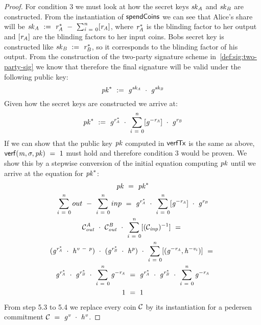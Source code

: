 \begin{proof}
    For condition 3 we must look at how the secret keys $\mathit{sk}_{\mathit{A}}$ and $\mathit{sk}_{\mathit{B}}$ are constructed.
    From the instantiation of $\mathsf{spendCoins}$ we can see that Alice's share will be $\mathit{sk}_{\mathit{A}} ~:=~ \mathit{r}_{\mathit{A}}^* ~-~ \sum_{\mathit{i} ~=~ 0}^{\mathit{n}} [\mathit{r}_{\mathit{A}}]$, where $\mathit{r}_{\mathit{A}}^*$ is the blinding factor to her output and $[\mathit{r}_{\mathit{A}}]$ are the blinding factors to her input coins.
    Bobs secret key is constructed like $\mathit{sk}_{\mathit{B}} ~:=~ \mathit{r}_{\mathit{B}}^*$, so it corresponds to the blinding factor of his output.
    From the construction of the two-party signature scheme in~\ref{def:sig:two-party-sig} we know that therefore the final signature will be valid under the following public key:
    \[ \mathit{pk}^* ~:=~ \mathit{g}^{\mathit{sk}_{\mathit{A}}} ~\cdot~ \mathit{g}^{\mathit{sk}_{\mathit{B}}} \]
    Given how the secret keys are constructed we arrive at:
    \[ \mathit{pk}^* ~:=~ \mathit{g}^{\mathit{r}_{\mathit{A}}^*} ~\cdot~ \sum_{\mathit{i} ~=~ 0}^{\mathit{n}} [\mathit{g}^{- \mathit{r}_{\mathit{A}}}] ~\cdot~ \mathit{g}^{\mathit{r}_{\mathit{B}}} \]
    If we can show that the public key $\mathit{pk}$ computed in $\mathsf{verfTx}$ is the same as above, $\mathsf{verf}(\mathit{m}, \sigma, \mathit{pk}) ~=~ 1$ must hold and therefore condition 3 would be proven.
    We show this by a stepwise conversion of the initial equation computing $\mathit{pk}$ until we arrive at the equation for $\mathit{pk}^*$:
    \begin{gather}
        \mathit{pk} ~=~ \mathit{pk}^* \\
        \sum_{\mathit{i} ~=~ 0}^{\mathit{n}} out ~-~ \sum_{\mathit{i} ~=~ 0}^{\mathit{n}} inp ~=~ \mathit{g}^{\mathit{r}_{\mathit{A}}^*} ~\cdot~ \sum_{\mathit{i} ~=~ 0}^{\mathit{n}} [\mathit{g}^{- \mathit{r}_{\mathit{A}}}] ~\cdot~ \mathit{g}^{\mathit{r}_{\mathit{B}}} \\
        \mathcal{C}_{\mathit{out}}^{\mathit{A}} ~\cdot~ \mathcal{C}_{\mathit{out}}^{\mathit{B}} ~\cdot~ \sum_{\mathit{i} ~=~ 0}^{\mathit{n}} [(\mathcal{C}_{\mathit{inp}})^{-1}]  ~=~\\
        (\mathit{g}^{\mathit{r}_{\mathit{A}}^*} ~\cdot~ \mathit{h}^{\mathit{v} ~-~ \mathit{p}}) ~\cdot~
        (\mathit{g}^{\mathit{r}_{\mathit{B}}^*} ~\cdot~ \mathit{h}^{\mathit{p}}) ~\cdot~
        \sum_{\mathit{i} ~=~ 0}^{\mathit{n}} [(\mathit{g}^{- \mathit{r}_{\mathit{A}}}, \mathit{h}^{- \mathit{v}_i})] ~=~ \\
        \mathit{g}^{\mathit{r}_{\mathit{A}}^*} ~\cdot~ \mathit{g}^{\mathit{r}_{\mathit{B}}^*} ~\cdot~ \sum_{\mathit{i} ~=~ 0}^{\mathit{n}} \mathit{g}^{- \mathit{r}_{\mathit{A}}} ~=~ \mathit{g}^{\mathit{r}_{\mathit{A}}^*} ~\cdot~ \mathit{g}^{\mathit{r}_{\mathit{B}}^*} ~\cdot~ \sum_{\mathit{i} ~=~ 0}^{\mathit{n}} \mathit{g}^{- \mathit{r}_{\mathit{A}}} \\
        1 ~=~ 1
    \end{gather}
    From step 5.3 to 5.4 we replace every coin $\mathcal{C}$ by its instantiation for a pedersen commitment $\mathcal{C} ~=~ \mathit{g}^{\mathit{v}} ~\cdot~ \mathit{h}^{\mathit{v}}$.


\end{proof}
